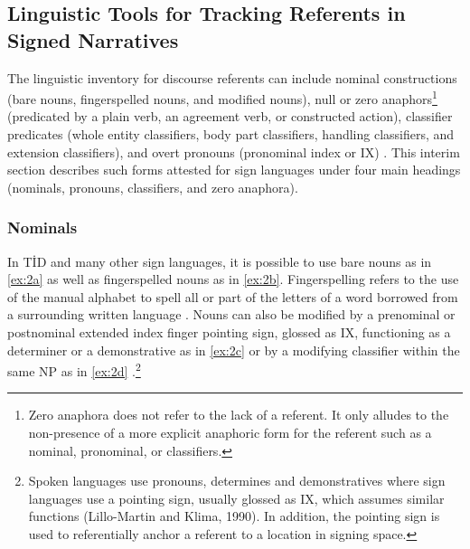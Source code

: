 \documentclass[review]{elsarticle} %
\begin{document}
\hypertarget{linguistic-tools-for-tracking-referents-in-signed-narratives}{%
\subsection{Linguistic Tools for Tracking Referents in Signed
Narratives}\label{linguistic-tools-for-tracking-referents-in-signed-narratives}}

The linguistic inventory for discourse referents can include nominal
constructions (bare nouns, fingerspelled nouns, and modified nouns),
null or zero
anaphors\footnote{Zero anaphora does not refer to the lack of a referent. It only alludes to the non-presence of a more explicit anaphoric form for the referent such as a nominal, pronominal, or classifiers.}
(predicated by a plain verb, an agreement verb, or constructed action),
classifier predicates (whole entity classifiers, body part classifiers,
handling classifiers, and extension classifiers), and overt pronouns
(pronominal index or IX) \citep{frederiksen2016}. This interim section
describes such forms attested for sign languages under four main
headings (nominals, pronouns, classifiers, and zero anaphora).

\hypertarget{nominals}{%
\subsubsection{Nominals}\label{nominals}}

In TİD and many other sign languages, it is possible to use bare nouns
as in \ref{ex:2a} as well as fingerspelled nouns as in \ref{ex:2b}.
Fingerspelling refers to the use of the manual alphabet to spell all or
part of the letters of a word borrowed from a surrounding written
language \citep{kubus2008}. Nouns can also be modified by a prenominal
or postnominal extended index finger pointing sign, glossed as IX,
functioning as a determiner or a demonstrative as in \ref{ex:2c}
\citep{maclaughlin1997} or by a modifying classifier within the same NP
as in \ref{ex:2d}
\citep{frederiksen2016}.\footnote{Spoken languages use pronouns, determines and demonstratives where sign languages use a pointing sign, usually glossed as IX, which assumes similar functions (Lillo-Martin and Klima, 1990). In addition, the pointing sign is used to referentially anchor a referent to a location in signing space.}
\end{document}
